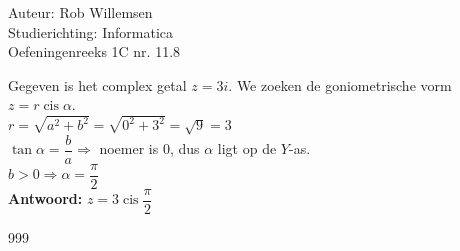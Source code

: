 \documentclass[a4paper]{article}
\begin{document}
\noindent \large Auteur: Rob Willemsen \\
\noindent \large Studierichting: Informatica\\
\noindent \large Oefeningenreeks 1C nr. 11.8\\

\medskip
\normalsize

Gegeven is het complex getal $z = 3i$. We zoeken de goniometrische vorm $z = r \operatorname{cis} \alpha$. \\

$r = \sqrt{a^2 + b^2} = \sqrt{0^2 + 3^2} = \sqrt{9} = 3$ \\

$\tan \alpha = \dfrac{b}{a} \Rightarrow $ noemer is 0, dus $\alpha$ ligt op de $Y$-as.  \\

$b > 0 \Rightarrow \alpha = \dfrac{\pi}{2}$ \\

\textbf{Antwoord:} $z = 3 \operatorname{cis} \dfrac{\pi}{2}$ \\

\begin{thebibliography}{999}
\end{thebibliography}
\end{document}
